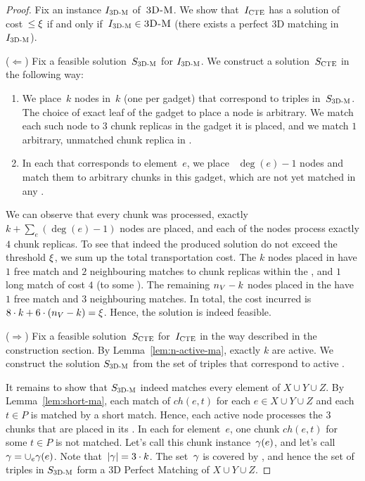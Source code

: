 \begin{proof}
  
  Fix an instance $I_{\mathrm{\textsc{3D-M}}}$ of~$\textsc{3D-M}$.
  We show that~$I_{\mathrm{\textsc{CTE}}}$ has a solution of cost~$\leq \xi$ if and only if~$I_{\mathrm{\textsc{3D-M}}} \in \textsc{3D-M}$ (there exists a perfect 3D matching in $I_{\mathrm{\textsc{3D-M}}}$).

  ($\Leftarrow$) Fix a feasible solution~$S_{\mathrm{\textsc{3D-M}}}$ for $I_{\mathrm{\textsc{3D-M}}}$.
  We construct a solution~$S_{\mathrm{\textsc{CTE}}}$ in the following way:
  \begin{enumerate}
    \item We place~$k$ nodes in~$k$ {\TripleGadgets} (one per gadget) that correspond to triples in~$S_{\mathrm{\textsc{3D-M}}}$.
    The choice of exact leaf of the gadget to place a node is arbitrary.
    We match each such node to $3$ chunk replicas in the gadget it is placed, and we match $1$ arbitrary, unmatched chunk replica in {\UnqSubtree}.
    \item In each {\ElGadget} that corresponds to element~$e$, we place
   ~$\deg(e) - 1$ nodes and match them to arbitrary chunks in this
    gadget, which are not yet matched in any {\TripleGadget}.
  \end{enumerate}

  We can observe that every chunk was processed, exactly $k + \sum_e(\deg(e) - 1)$ nodes are placed, and each of the nodes process exactly $4$ chunk replicas.
  To see that indeed the produced solution do not exceed the threshold $\xi$, we sum up the total transportation cost.
  The $k$ nodes placed in \TripleGadgets{} have $1$ free match and $2$ neighbouring matches to chunk replicas within the \TripleGadget{}, and $1$ long match of cost $4$ (to some \UnqGadget{}).
  The remaining $n_V-k$ nodes placed in the \CoverSubtree{} have $1$ free match and $3$ neighbouring matches.
  In total, the cost incurred is $8\cdot k + 6\cdot (n_V - k) = \xi$.
  Hence, the solution is indeed feasible.

  ($\Rightarrow$) Fix a feasible solution~$S_{\mathrm{\textsc{CTE}}}$ for~$I_{\mathrm{\textsc{CTE}}}$ in the way described in the construction section.
  By Lemma~\ref{lem:n-active-ma}, exactly $k$ \TripleGadgets{} are active.
  We construct the solution $S_{\mathrm{\textsc{3D-M}}}$ from the set of triples that correspond to active \TripleGadgets{}.

  It remains to show that $S_{\mathrm{\textsc{3D-M}}}$ indeed matches every element of $X\cup Y\cup Z$.
  By Lemma~\ref{lem:short-ma}, each match of $ch(e, t)$ for each $e\in X\cup Y\cup Z$ and each $t \in P$ is matched by a short match.
  Hence, each active node processes the 3 chunks that are placed in its \TripleGadget.
  In each {\ElGadget} for element~$e$, one chunk $ch(e, t)$ for some $t \in P$ is not matched.
  Let's call this chunk instance~$\gamma(e)$, and let's call~$\gamma = \cup_e \gamma(e)$.
  Note that~$|\gamma| = 3\cdot k$.
  The set~$\gamma$ is covered by \ActiveNodes{}, and hence the set of triples in $S_{\mathrm{\textsc{3D-M}}}$ form a 3D Perfect Matching of $X\cup Y\cup Z$.
\end{proof}



